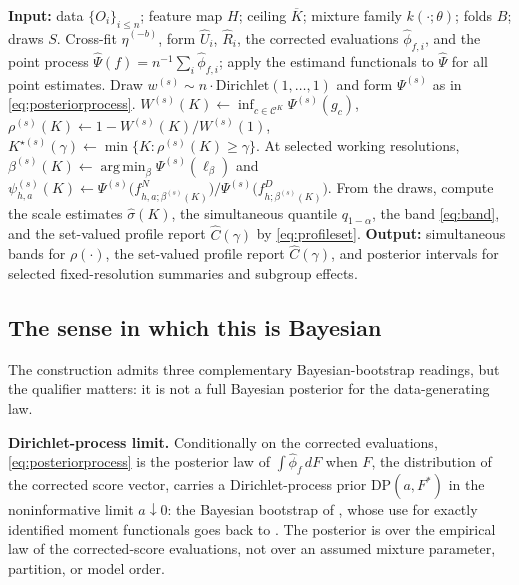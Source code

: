 \documentclass[11pt]{article}
\DeclareMathOperator*{\argmin}{arg\,min}
\newcommand{\calC}{\mathcal C}
\newcommand{\hateta}{\widehat\eta}
\newcommand{\hU}{\widehat U}
\newcommand{\hR}{\widehat R}
\newcommand{\hPsi}{\widehat\Psi}
\newcommand{\hphi}{\widehat\phi}
\begin{document}
\begin{algorithm}[ht!]
\caption{Feature-law posterior for causal subgroup analysis}\label{alg:main}
\begin{algorithmic}[1]
\State \textbf{Input:} data $\{O_i\}_{i\le n}$; feature map $H$; ceiling $\overline K$; mixture family $k(\cdot;\theta)$; folds $B$; draws $S$.
\State Cross-fit $\hateta^{(-b)}$, form $\hU_i$, $\hR_i$, the corrected evaluations $\hphi_{f,i}$, and the point process $\hPsi(f)=n^{-1}\sum_i\hphi_{f,i}$; apply the estimand functionals to $\hPsi$ for all point estimates.
\State Draw $w^{(s)}\sim n\cdot\mathrm{Dirichlet}(1,\dots,1)$ and form $\Psi^{(s)}$ as in \eqref{eq:posteriorprocess}.
\State $W^{(s)}(K)\gets\inf_{c\in\calC^K}\Psi^{(s)}(g_c)$, $\rho^{(s)}(K)\gets 1-W^{(s)}(K)/W^{(s)}(1)$, $K^{\star(s)}(\gamma)\gets\min\{K:\rho^{(s)}(K)\ge\gamma\}$.
\State At selected working resolutions, $\beta^{(s)}(K)\gets\argmin_\beta\Psi^{(s)}(\ell_\beta)$ and $\psi^{(s)}_{h,a}(K)\gets\Psi^{(s)}\bigl(f^N_{h,a;\beta^{(s)}(K)}\bigr)\big/\Psi^{(s)}\bigl(f^D_{h;\beta^{(s)}(K)}\bigr)$.
\EndFor
\State From the draws, compute the scale estimates $\hat\sigma(K)$, the simultaneous quantile $q_{1-\alpha}$, the band \eqref{eq:band}, and the set-valued profile report $\widehat C(\gamma)$ by \eqref{eq:profileset}.
\State \textbf{Output:} simultaneous bands for $\rho(\cdot)$, the set-valued profile report $\widehat C(\gamma)$, and posterior intervals for selected fixed-resolution summaries and subgroup effects.
\end{algorithmic}
\end{algorithm}

\subsection{The sense in which this is Bayesian}\label{sec:bayesian}

The construction admits three complementary Bayesian-bootstrap readings, but the qualifier matters: it is not a full Bayesian posterior for the data-generating law.

\textbf{Dirichlet-process limit.} Conditionally on the corrected evaluations, \eqref{eq:posteriorprocess} is the posterior law of $\int\hphi_f\,dF$ when $F$, the distribution of the corrected score vector, carries a Dirichlet-process prior $\mathrm{DP}(a,F^*)$ in the noninformative limit $a\downarrow0$: the Bayesian bootstrap of \cite{rubin1981}, whose use for exactly identified moment functionals goes back to \cite{newton1994}. The posterior is over the empirical law of the corrected-score evaluations, not over an assumed mixture parameter, partition, or model order.
\end{document}
